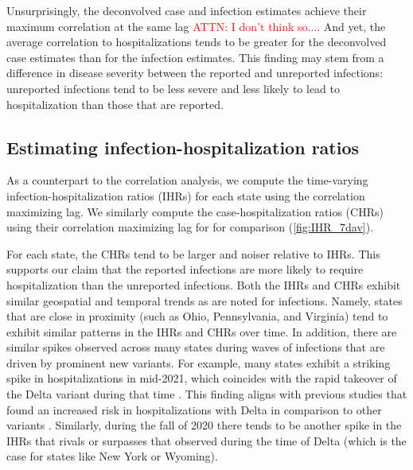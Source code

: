 \documentclass{article}
\newcommand{\attn }[1]{\textcolor{red}{ATTN: #1}}
\begin{document}

Unsurprisingly, the deconvolved case and infection estimates achieve their
maximum correlation at the same lag \attn{I don't think so...}. And yet, the average correlation to
hospitalizations tends to be greater for the deconvolved case estimates than for
the infection estimates. This finding may
stem from a difference in disease severity between the reported and unreported
infections: unreported infections tend to be less severe and less likely to
lead to hospitalization than those that are reported.




\subsection{Estimating infection-hospitalization ratios}
\label{sec:ihrs}

As a counterpart to the correlation analysis, we compute the time-varying
infection-hospitalization ratios (IHRs) for each state using the correlation
maximizing lag. We similarly compute the
case-hospitalization ratios (CHRs) using their correlation maximizing lag for
for comparison (\autoref{fig:IHR_7dav}). 

For each state, the CHRs tend to be larger and noiser relative to
IHRs. This supports our claim that the reported infections are more
likely to require hospitalization than the unreported infections. Both the IHRs
and CHRs exhibit similar geospatial and temporal trends as are noted for
infections. Namely, states that are close in proximity (such as Ohio,
Pennsylvania, and Virginia) tend to exhibit similar patterns in the IHRs and
CHRs over time. In addition, there are similar spikes observed across many
states during waves of infections that are driven by prominent new variants. For
example, many states exhibit a striking spike in hospitalizations in mid-2021,
which coincides with the rapid takeover of the Delta variant during that time
\citep{hodcroft2021covariants}. This finding aligns with previous studies that
found an increased risk in hospitalizations with Delta in comparison to other
variants \citep{twohig2022hospital, nyberg2022comparative}. Similarly, during
the fall of 2020 there tends to be another spike in the IHRs that rivals or
surpasses that observed during the time of Delta (which is the case for states
like New York or Wyoming). 
\end{document}
